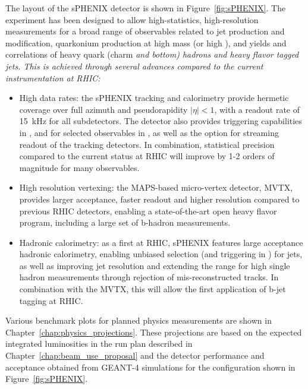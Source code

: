 The layout of the sPHENIX detector is shown in Figure~\ref{fig:sPHENIX}. The experiment has been designed to allow high-statistics, high-resolution measurements for a broad range of observables related to jet production and modification, quarkonium production
at high mass (or high \pt), and yields and correlations of heavy quark (charm \em and \em bottom) hadrons and heavy flavor tagged jets.
This is achieved through several advances compared to the current instrumentation at RHIC:
\begin{itemize}
    \item High data rates: the sPHENIX tracking and calorimetry provide hermetic coverage over full azimuth and pseudorapidity $|\eta| < 1$, with a readout rate of 15~kHz for all subdetectors. The detector also provides triggering capabilities in \pp, and for selected observables in \auau, as well as the option for streaming readout of the tracking detectors. In combination, statistical precision compared to the current status at RHIC will improve  by 1-2 orders of magnitude for many observables.
    \item High resolution vertexing: the MAPS-based micro-vertex detector, MVTX, provides larger acceptance, faster readout and higher resolution compared to previous RHIC detectors, enabling a state-of-the-art open heavy flavor program, including a large set of b-hadron measurements. 
    \item Hadronic calorimetry: as a first at RHIC, sPHENIX features large acceptance hadronic calorimetry, enabling unbiased selection (and triggering in \pp) for jets, as well as improving jet resolution and extending the range for high \pt single hadron measurements through rejection of mis-reconstructed tracks. In combination with the MVTX, this will allow the first application of b-jet tagging at RHIC. 
\end{itemize}

 Various benchmark plots for planned physics
measurements are shown in Chapter~\ref{chap:physics_projections}. These projections are based on the expected integrated luminosities in the run plan described in Chapter~\ref{chap:beam_use_proposal} and the detector performance and acceptance obtained from {\textsc{GEANT-4}} simulations for the configuration shown in Figure~\ref{fig:sPHENIX}. 

